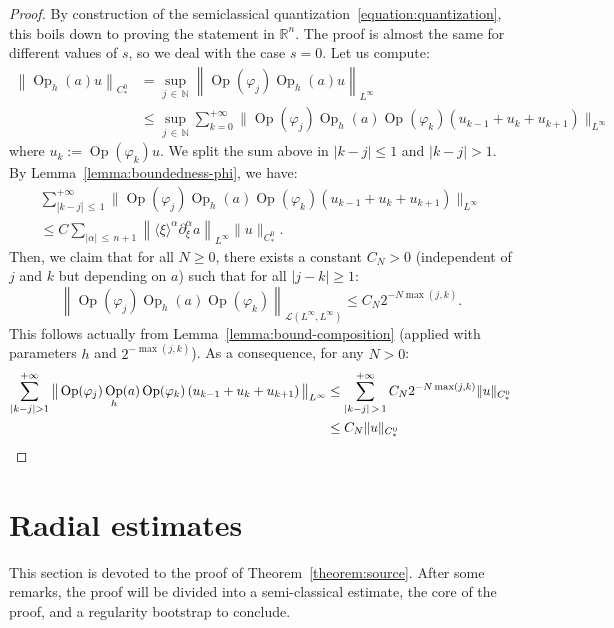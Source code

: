 \documentclass[AHL,Unicode,longabstracts,published]{cedram}
\newcommand{\R}{\mathbb{R}}
\newcommand{\N}{\mathbb{N}}
\newcommand{\mc}{\mathcal}
\DeclareMathOperator{\Op}{Op}
\begin{document}
\begin{proof}
By construction of the semiclassical quantization~\eqref{equation:quantization}, this boils down to proving the statement in $\R^n$. The proof is almost the same for different values of $s$, so we deal with the case $s=0$. Let us compute:
\begin{align*}
\left\|\Op_h(a)u\right\|_{C^0_*} & = \sup_{j\,\in\,\N} \left\|\Op(\varphi_j) \Op_h(a)u\right\|_{L^\infty} \\
& \leq \sup_{j\,\in\,\N} \sum_{k=0}^{+\infty}\big\|\Op(\varphi_j) \Op_h(a)\Op(\varphi_k)\left(u_{k-1}+u_k+u_{k+1}\right)\big\|_{L^\infty}
\end{align*}
where $u_k := \Op(\varphi_k)u$. We split the sum above in $|k-j| \leq 1$ and $|k-j| > 1$. By Lemma~\ref{lemma:boundedness-phi}, we have:
\begin{multline*}
\sum_{|k-j|\, \leq\,1}^{+\infty} \big\|\Op(\varphi_j) \Op_h(a)\Op(\varphi_k)\left(u_{k-1}+u_k+u_{k+1}\right)\big\|_{L^\infty} \\
\leq C \sum_{|\alpha|\,\leq\,n+1} \left\|\langle \xi \rangle^\alpha \partial^\alpha_\xi a\right\|_{L^\infty} \|u\|_{C^0_*}.
\end{multline*}
Then, we claim that for all $N \geq 0$, there exists a constant $C_N > 0$ (independent of $j$ and $k$ but depending on $a$) such that for all $|j-k| \geq 1$:
\begin{equation}\label{equation:decroissance-off-diagonal}
\left\|\Op(\varphi_j) \Op_h(a)\Op(\varphi_k)\right\|_{\mc{L}\left(L^\infty,L^\infty\right)} \leq C_N 2^{-N\max(j,k)}.
\end{equation}
This follows actually from Lemma~\ref{lemma:bound-composition} (applied with parameters $h$ and $2^{-\max(j,k)}$). As a consequence, for any $N > 0$:
\begin{align*}
\sum_{|k-j| > 1}^{+\infty} \big\|\Op(\varphi_j) \Op_h(a)\Op(\varphi_k)\left(u_{k-1}+u_k+u_{k+1}\right)\big\|_{L^\infty} & \leq \sum_{|k-j|\,>\, 1}^{+\infty} C_N 2^{-N\max(j,k)} \|u\|_{C^0_*} \\
& \leq C_N \|u\|_{C^0_*}\qedhere
\end{align*}
\end{proof}


\section{Radial estimates}\label{section:estimates}

This section is devoted to the proof of Theorem~\ref{theorem:source}. After some remarks, the proof will be divided into a semi-classical estimate, the core of the proof, and a regularity bootstrap to conclude.
\end{document}
